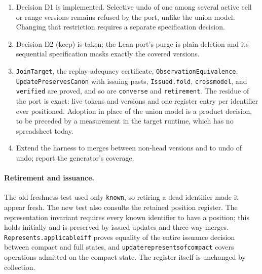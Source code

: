 \documentclass[11pt]{article}
\newcommand{\lean}[1]{\texttt{\def\_{\textunderscore\allowbreak}#1}}
\begin{document}
\begin{enumerate}
\item Decision D1 is implemented. Selective undo of one among several active
cell or range versions remains refused by the port, unlike the union model.
Changing that restriction requires a separate specification decision.
\item Decision D2 (keep) is taken; the Lean port's purge is plain deletion
and its sequential specification masks exactly the covered versions.
\item \lean{JoinTarget}, the replay-adequacy certificate,
\lean{ObservationEquivalence}, \lean{UpdatePreservesCanon} with issuing
pasts, \lean{Issued.fold}, \lean{cross\_model}, and \lean{verified} are
proved, and so are \lean{converse} and \lean{retirement}. The residue of the
port is exact: live tokens and versions and one register entry per
identifier ever positioned. Adoption in place of the union model is a
product decision, to be preceded by a measurement in the target runtime,
which has no spreadsheet today.
\item Extend the harness to merges between non-head versions and to undo of
undo; report the generator's coverage.
\end{enumerate}

\paragraph{Retirement and issuance.} The old freshness test used only
\lean{known}, so retiring a dead identifier made it appear fresh. The new
test also consults the retained position register. The representation
invariant requires every known identifier to have a position; this holds
initially and is preserved by issued updates and three-way merges.
\lean{Represents.applicable\_iff} proves equality of the entire issuance
decision between compact and full states, and
\lean{update\_represents\_of\_compact} covers operations admitted on the
compact state. The register itself is unchanged by collection.
\end{document}
